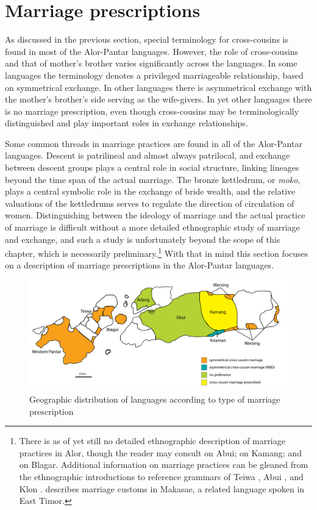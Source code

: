 \section{Marriage prescriptions}\label{sec:5:4}
As discussed in the previous section, special terminology for cross-cousins is found in most of the Alor-Pantar languages. However, the role of cross-cousins and that of mother's brother varies significantly across the languages. In some languages the terminology denotes a privileged marriageable relationship, based on symmetrical exchange. In other languages there is asymmetrical exchange with the mother's brother's side serving as the wife-givers. In yet other languages there is no marriage prescription, even though cross-cousins may be terminologically distinguished and  play important roles in exchange relationships. 

Some common threads in marriage practices are found in all of the Alor-Pantar languages. Descent is patrilineal and almost always patrilocal, and exchange between descent groups plays a central role in social structure, linking lineages beyond the time span of the actual marriage. The bronze kettledrum, or \textit{moko}, plays a central symbolic role in the exchange of bride wealth, and the relative valuations of the kettledrums serves to regulate the direction of circulation of women. Distinguishing between the ideology of marriage and the actual practice of marriage is difficult without a more detailed ethnographic study of marriage and exchange, and such a study is unfortunately beyond the scope of this chapter, which is necessarily preliminary.\footnote{There is as of yet still no detailed ethnographic description of marriage practices in Alor, though the reader may consult \citet{Nicolspeyer1940} on Abui; \citet{Stokhof1977} on Kamang; and \citet{Steinhauer2010} on Blagar. Additional information on marriage practices can be gleaned from the ethnographic introductions to reference grammars of Teiwa \citep{Klamer2010grammar}, Abui \citep{Kratochvil2007}, and Klon \citep{Baird2008}. \citet{Forman1980} describes marriage customs in Makasae, a related language spoken in East Timor.} With that in mind this section focuses on a description of marriage prescriptions in the Alor-Pantar languages. 

\begin{figure}[h]
\centering
\includegraphics[width=\textwidth]{figures/Holton_ch5_fig16.pdf}
\caption{Geographic distribution of languages according to type of marriage prescription}
\label{fig:5:16}
\end{figure}

